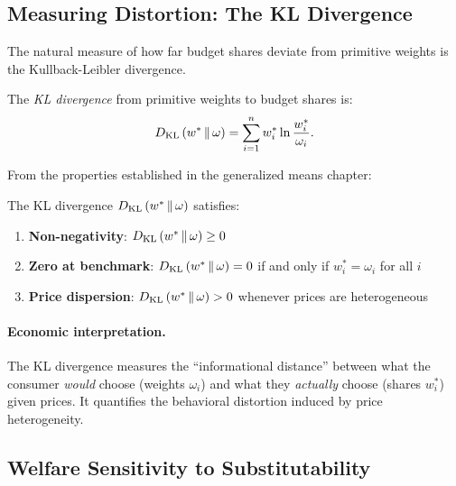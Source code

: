 \subsection{Measuring Distortion: The KL Divergence}
\label{subsec:kl-divergence}

The natural measure of how far budget shares deviate from primitive weights is the Kullback-Leibler divergence.

\begin{definition}
\label{def:kl-shares}
The \emph{KL divergence} from primitive weights to budget shares is:
\begin{equation}
D_{\mathrm{KL}}\left(w^* \,\|\, \omega\right) = \sum_{i=1}^{n} w_i^* \ln \frac{w_i^*}{\omega_i}.
\end{equation}
\end{definition}

From the properties established in the generalized means chapter:

\begin{proposition}
\label{prop:kl-properties}
The KL divergence $D_{\mathrm{KL}}\left(w^* \,\|\, \omega\right)$ satisfies:
\begin{enumerate}[label=(\roman*), leftmargin=2em]
    \item \textbf{Non-negativity}: $D_{\mathrm{KL}}\left(w^* \,\|\, \omega\right) \geq 0$
    \item \textbf{Zero at benchmark}: $D_{\mathrm{KL}}\left(w^* \,\|\, \omega\right) = 0$ if and only if $w_i^* = \omega_i$ for all $i$
    \item \textbf{Price dispersion}: $D_{\mathrm{KL}}\left(w^* \,\|\, \omega\right) > 0$ whenever prices are heterogeneous
\end{enumerate}
\end{proposition}

\paragraph{Economic interpretation.}
The KL divergence measures the ``informational distance'' between what the consumer \emph{would} choose (weights $\omega_i$) and what they \emph{actually} choose (shares $w_i^*$) given prices. It quantifies the behavioral distortion induced by price heterogeneity.

\subsection{Welfare Sensitivity to Substitutability}
\label{subsec:welfare-sensitivity}

